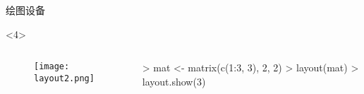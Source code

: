 \begin{frame}[t, fragile]{\subsecname}{绘图设备}
\begin{overlayarea}{\textwidth}{\textheight}
\begin{onlyenv}<4>
      \begin{columns}
        \begin{column}{.4\textwidth}
          \begin{figure}
            \centering
            \texttt{[image: layout2.png]}
          \end{figure}
        \end{column}

        \begin{column}{.6\textwidth}
 \centering
\begin{rcode}
> mat <- matrix(c(1:3, 3), 2, 2)
> layout(mat)
> layout.show(3)
\end{rcode}
        \end{column}
      \end{columns}
\end{onlyenv}
\end{overlayarea}
\end{frame} 

